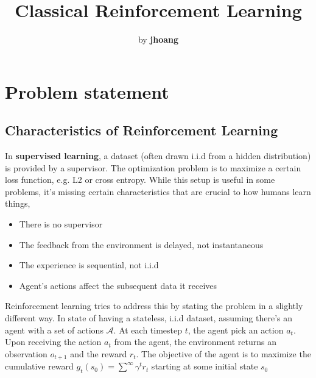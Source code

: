 \documentclass[graybox]{svmult}
\begin{document}
\title*{Classical Reinforcement Learning}
\author{by \textbf{jhoang}}


%
%
\maketitle



\section{Problem statement}

\subsection{Characteristics of Reinforcement Learning}

In \textbf{supervised learning}, a dataset (often drawn i.i.d from a hidden distribution) is provided by a supervisor. The optimization problem is to maximize a certain loss function, e.g. L2 or cross entropy. While this setup is useful in some problems, it's missing certain characteristics that are crucial to how humans learn things,
\begin{itemize}
 \item There is no supervisor
 \item The feedback from the environment is delayed, not instantaneous 
 \item The experience is sequential, not i.i.d
 \item Agent's actions affect the subsequent data it receives
\end{itemize}

Reinforcement learning tries to address this by stating the problem in a slightly different way. In state of having a stateless, i.i.d dataset, assuming there's an agent with a set of actions $\mathcal{A}$. At each timestep $t$, the agent pick an action $a_t$. Upon receiving the action $a_t$ from the agent, the environment returns an observation $o_{t+1}$ and the reward $r_t$. The objective of the agent is to maximize the cumulative reward $g_t(s_0) = \sum^{\infty} \gamma^t r_t$ starting at some initial state $s_0$
\end{document}
